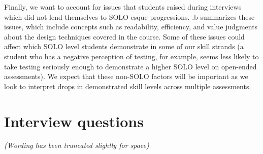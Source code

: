 Finally, we want to account for issues that students raised during
interviews which did not lend themselves to SOLO-esque progressions.
.b
summarizes these issues, which include concepts such as
readability, efficiency, and value judgments about the design
techniques covered in the course.  Some of these issues could
affect which SOLO level students demonstrate in some of our skill strands (a
student who has a negative perception of testing, for example, seems
less likely to take testing seriously enough to demonstrate a higher
SOLO level on open-ended assessments).  We expect that these non-SOLO
factors will be important as we look to interpret drops in
demonstrated skill levels across multiple assessments.






\appendix

\section{Interview questions}
\label{f:session-ques}
\emph{(Wording has been truncated slightly for space)}

